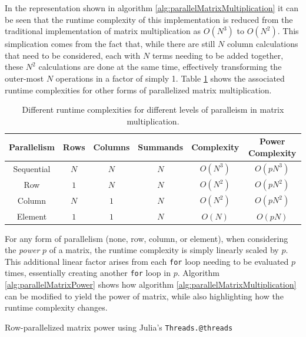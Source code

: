\documentclass{article}
\begin{document}
    In the representation shown in algorithm \ref{alg:parallelMatrixMultiplication} it can be seen that the runtime complexity of this implementation is reduced from the traditional implementation of matrix multiplication as $O(N^3)$ to $O(N^2)$.  This simplication comes from the fact that, while there are still $N$ column calculations that need to be considered, each with $N$ terms needing to be added together, these $N^2$ calculations are done at the same time, effectively transforming the outer-most $N$ operations in a factor of simply 1. Table \ref{tbl:runtimeComplexity} shows the associated runtime complexities for other forms of parallelized matrix multiplication.
    
    \begin{table}[h]
        \centering
        \begin{tabular}{|c||c|c|c|c|c|}
            \hline
            Parallelism & Rows & Columns & Summands & Complexity & Power Complexity \\
            \hline
            \hline
            Sequential & $N$  & $N$     & $N$      & $O(N^3)$    & $O(p N^3)$   \\
            \hline
            Row    & $1$  & $N$     & $N$      & $O(N^2)$        & $O(p N^2)$   \\
            \hline
            Column & $N$  & $1$     & $N$      & $O(N^2)$        & $O(p N^2)$   \\
            \hline
            Element & $1$  & $1$    & $N$      & $O(N)$          & $O(p N)$   \\
            \hline
        \end{tabular}
        \caption{Different runtime complexities for different levels of paralleism in matrix multiplication.}
        \label{tbl:runtimeComplexity}
    \end{table}

    For any form of parallelism (none, row, column, or element), when considering the \emph{power} $p$ of a matrix, the runtime complexity is simply linearly scaled by $p$.  This additional linear factor arises from each \verb|for| loop needing to be evaluated $p$ times, essentially creating another \verb|for| loop in $p$.  Algorithm \ref{alg:parallelMatrixPower} shows how algorithm \ref{alg:parallelMatrixMultiplication} can be modified to yield the power of matrix, while also highlighting how the runtime complexity changes.

    \begin{algorithm}[h!]
        \caption{Row-parallelized matrix power using Julia's \texttt{Threads.@threads}}
        \label{alg:parallelMatrixPower}
    \end{algorithm}
\end{document}

